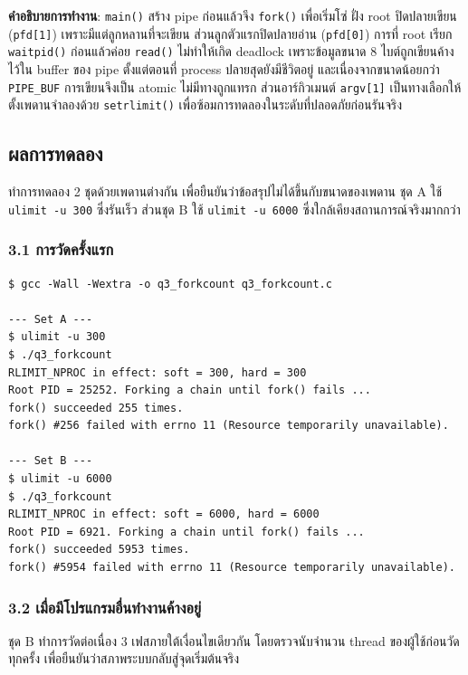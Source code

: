 \documentclass[a4paper,12pt]{article}
\newcommand{\code}[1]{\texttt{#1}}
\begin{document}
\textbf{คำอธิบายการทำงาน}: \code{main()} สร้าง pipe ก่อนแล้วจึง \code{fork()} เพื่อเริ่มโซ่ ฝั่ง root ปิดปลายเขียน (\code{pfd[1]}) เพราะมีแต่ลูกหลานที่จะเขียน ส่วนลูกตัวแรกปิดปลายอ่าน (\code{pfd[0]}) การที่ root เรียก \code{waitpid()} ก่อนแล้วค่อย \code{read()} ไม่ทำให้เกิด deadlock เพราะข้อมูลขนาด 8 ไบต์ถูกเขียนค้างไว้ใน buffer ของ pipe ตั้งแต่ตอนที่ process ปลายสุดยังมีชีวิตอยู่ และเนื่องจากขนาดน้อยกว่า \code{PIPE\_BUF} การเขียนจึงเป็น atomic ไม่มีทางถูกแทรก ส่วนอาร์กิวเมนต์ \code{argv[1]} เป็นทางเลือกให้ตั้งเพดานจำลองด้วย \code{setrlimit()} เพื่อซ้อมการทดลองในระดับที่ปลอดภัยก่อนรันจริง

\newpage

\subsection{ผลการทดลอง}

ทำการทดลอง 2 ชุดด้วยเพดานต่างกัน เพื่อยืนยันว่าข้อสรุปไม่ได้ขึ้นกับขนาดของเพดาน
ชุด A ใช้ \code{ulimit -u 300} ซึ่งรันเร็ว ส่วนชุด B ใช้ \code{ulimit -u 6000}
ซึ่งใกล้เคียงสถานการณ์จริงมากกว่า

\subsubsection{3.1 การวัดครั้งแรก}

\begin{lstlisting}[style=terminal,caption={ผลลัพธ์การวัดครั้งแรกของทั้งสองชุด}]
$ gcc -Wall -Wextra -o q3_forkcount q3_forkcount.c

--- Set A ---
$ ulimit -u 300
$ ./q3_forkcount
RLIMIT_NPROC in effect: soft = 300, hard = 300
Root PID = 25252. Forking a chain until fork() fails ...
fork() succeeded 255 times.
fork() #256 failed with errno 11 (Resource temporarily unavailable).

--- Set B ---
$ ulimit -u 6000
$ ./q3_forkcount
RLIMIT_NPROC in effect: soft = 6000, hard = 6000
Root PID = 6921. Forking a chain until fork() fails ...
fork() succeeded 5953 times.
fork() #5954 failed with errno 11 (Resource temporarily unavailable).
\end{lstlisting}

\subsubsection{3.2 เมื่อมีโปรแกรมอื่นทำงานค้างอยู่}

ชุด B ทำการวัดต่อเนื่อง 3 เฟสภายใต้เงื่อนไขเดียวกัน โดยตรวจนับจำนวน thread
ของผู้ใช้ก่อนวัดทุกครั้ง เพื่อยืนยันว่าสภาพระบบกลับสู่จุดเริ่มต้นจริง
\end{document}
